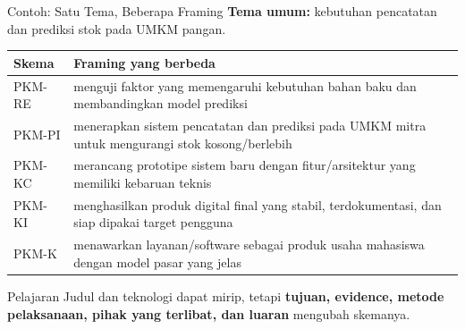 \documentclass[aspectratio=169,11pt]{beamer}
\begin{document}
\begin{frame}{Contoh: Satu Tema, Beberapa Framing}
\scriptsize
\textbf{Tema umum:} kebutuhan pencatatan dan prediksi stok pada UMKM pangan.

\vspace{2mm}
\begin{center}
\begin{tabular}{p{2.0cm} p{11.0cm}}
\toprule
\textbf{Skema} & \textbf{Framing yang berbeda} \\
\midrule
PKM-RE & menguji faktor yang memengaruhi kebutuhan bahan baku dan membandingkan model prediksi \\
PKM-PI & menerapkan sistem pencatatan dan prediksi pada UMKM mitra untuk mengurangi stok kosong/berlebih \\
PKM-KC & merancang prototipe sistem baru dengan fitur/arsitektur yang memiliki kebaruan teknis \\
PKM-KI & menghasilkan produk digital final yang stabil, terdokumentasi, dan siap dipakai target pengguna \\
PKM-K & menawarkan layanan/software sebagai produk usaha mahasiswa dengan model pasar yang jelas \\
\bottomrule
\end{tabular}
\end{center}

\begin{block}{Pelajaran}
\footnotesize
Judul dan teknologi dapat mirip, tetapi \textbf{tujuan, evidence, metode pelaksanaan, pihak yang terlibat, dan luaran} mengubah skemanya.
\end{block}
\end{frame}
\end{document}
